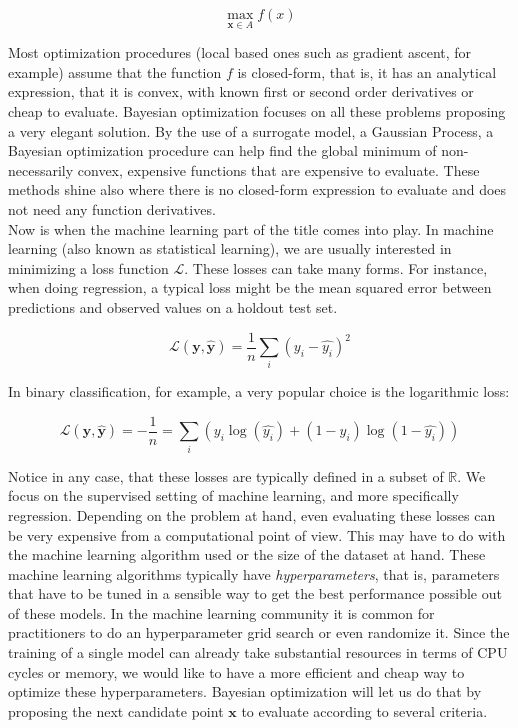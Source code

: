 \documentclass[10pt,a4paper,twoside]{book}
\begin{document}
\begin{equation}
\max_{\boldsymbol{x}\in A} f(x)
\end{equation}

Most optimization procedures (local based ones such as gradient ascent, for example) assume that the function $f$ is closed-form, that is, it has an analytical expression, that it is convex, with known first or second order derivatives or cheap to evaluate. Bayesian optimization focuses on all these problems proposing a very elegant solution. By the use of a surrogate model, a Gaussian Process, a Bayesian optimization procedure can help find the global minimum of non-necessarily convex, expensive functions that are expensive to evaluate. These methods shine also where there is no closed-form expression to evaluate and does not need any function derivatives.\\

Now is when the machine learning part of the title comes into play. In machine learning (also known as statistical learning), we are usually interested in minimizing a loss function $\mathcal{L}$. These losses can take many forms. For instance, when doing regression, a typical loss might be the mean squared error between predictions and observed values on a holdout test set.

\begin{equation}
\mathcal{L}(\boldsymbol{y}, \boldsymbol{\hat{y}}) = \dfrac{1}{n} \sum_i \left(y_i - \hat{y_i}\right)^2
\end{equation}

In binary classification, for example, a very popular choice is the logarithmic loss:

\begin{equation}
\mathcal{L}(\boldsymbol{y}, \boldsymbol{\hat{y}}) = -\dfrac{1}{n} = \sum_i \left(y_i \log(\hat{y_i}) + (1 - y_i)\log(1-\hat{y_i})\right)
\end{equation}

Notice in any case, that these losses are typically defined in a subset of $\mathbb{R}$. We focus on the supervised setting of machine learning, and more specifically regression. Depending on the problem at hand, even evaluating these losses can be very expensive from a computational point of view. This may have to do with the machine learning algorithm used or the size of the dataset at hand. These machine learning algorithms typically have \textit{hyperparameters}, that is, parameters that have to be tuned in a sensible way to get the best performance possible out of these models. In the machine learning community it is common for practitioners to do an hyperparameter grid search or even randomize it. Since the training of a single model can already take substantial resources in terms of CPU cycles or memory, we would like to have a more efficient and cheap way to optimize these hyperparameters. Bayesian optimization will let us do that by proposing the next candidate point $\boldsymbol{x}$ to evaluate according to several criteria.
\end{document}
